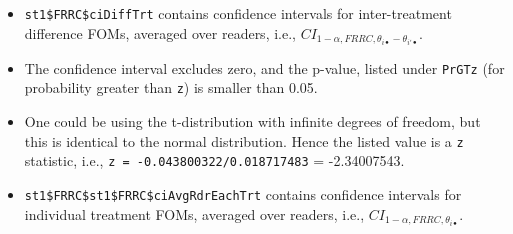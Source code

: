 \documentclass[
]{book}
\newenvironment{Shaded}{\begin{snugshade}}{\end{snugshade}}
\newcommand{\CommentTok}[1]{\textcolor[rgb]{0.56,0.35,0.01}{\textit{#1}}}
\newcommand{\DataTypeTok}[1]{\textcolor[rgb]{0.13,0.29,0.53}{#1}}
\newcommand{\DecValTok}[1]{\textcolor[rgb]{0.00,0.00,0.81}{#1}}
\newcommand{\KeywordTok}[1]{\textcolor[rgb]{0.13,0.29,0.53}{\textbf{#1}}}
\newcommand{\NormalTok}[1]{#1}
\newcommand{\OperatorTok}[1]{\textcolor[rgb]{0.81,0.36,0.00}{\textbf{#1}}}
\providecommand{\tightlist}{%
  \setlength{\itemsep}{0pt}\setlength{\parskip}{0pt}}
\begin{document}
\begin{itemize}
\tightlist
\item
  \texttt{st1\$FRRC\$ciDiffTrt} contains confidence intervals for inter-treatment difference FOMs, averaged over readers, i.e., \(CI_{1-\alpha,FRRC,\theta_{i \bullet} - \theta_{i' \bullet}}\).
\item
  The confidence interval excludes zero, and the p-value, listed under \texttt{PrGTz} (for probability greater than \texttt{z}) is smaller than 0.05.
\item
  One could be using the t-distribution with infinite degrees of freedom, but this is identical to the normal distribution. Hence the listed value is a \texttt{z} statistic, i.e., \texttt{z\ =\ -0.043800322/0.018717483} = -2.34007543.
\end{itemize}

\begin{Shaded}
\end{Shaded}

\begin{itemize}
\tightlist
\item
  \texttt{st1\$FRRC\$st1\$FRRC\$ciAvgRdrEachTrt} contains confidence intervals for individual treatment FOMs, averaged over readers, i.e., \(CI_{1-\alpha,FRRC,\theta_{i \bullet}}\).
\end{itemize}

\begin{Shaded}
\end{Shaded}
\end{document}
